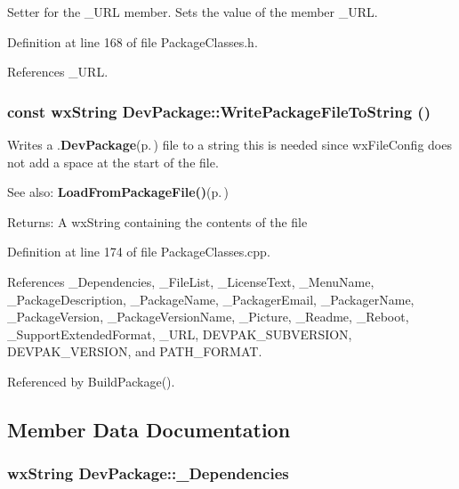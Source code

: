 Setter for the \_\-URL member. Sets the value of the member \_\-URL. 

Definition at line 168 of file Package\-Classes.h.

References \_\-URL.
\subsubsection{\setlength{\rightskip}{0pt plus 5cm}const wx\-String Dev\-Package::Write\-Package\-File\-To\-String ()}\label{class_dev_package_582087a094b37723a308a80610a94c5a}


Writes a .{\bf Dev\-Package}{\rm (p.\,\pageref{class_dev_package})} file to a string this is needed since wx\-File\-Config does not add a space at the start of the file. \begin{Desc}
\item[See also:]{\bf Load\-From\-Package\-File()}{\rm (p.\,\pageref{class_dev_package_5d4c41739aab3852483a0be0f01c9a93})} \end{Desc}
\begin{Desc}
\item[Returns:]A wx\-String containing the contents of the file \end{Desc}


Definition at line 174 of file Package\-Classes.cpp.

References \_\-Dependencies, \_\-File\-List, \_\-License\-Text, \_\-Menu\-Name, \_\-Package\-Description, \_\-Package\-Name, \_\-Packager\-Email, \_\-Packager\-Name, \_\-Package\-Version, \_\-Package\-Version\-Name, \_\-Picture, \_\-Readme, \_\-Reboot, \_\-Support\-Extended\-Format, \_\-URL, DEVPAK\_\-SUBVERSION, DEVPAK\_\-VERSION, and PATH\_\-FORMAT.

Referenced by Build\-Package().

\subsection{Member Data Documentation}
\subsubsection{\setlength{\rightskip}{0pt plus 5cm}wx\-String {\bf Dev\-Package::\_\-Dependencies}\hspace{0.3cm}{\tt  [private]}}\label{class_dev_package_b5b730c5deea1d68b1b44b01d30c0a44}


